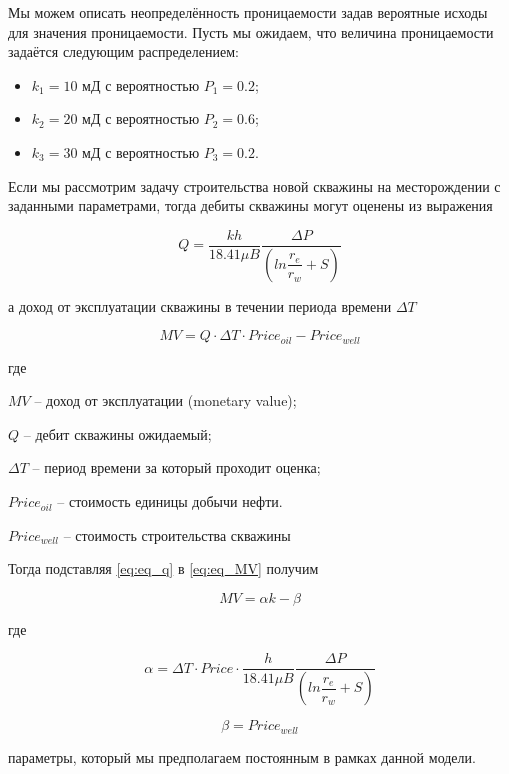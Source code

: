 Мы  можем описать неопределённость проницаемости задав вероятные исходы для значения проницаемости. Пусть мы ожидаем, что величина проницаемости задаётся следующим распределением:

\begin{itemize}
	\item $k_1 = 10$ мД с вероятностью $P_1 = 0.2$; 
	\item $k_2 = 20$ мД с вероятностью $P_2 = 0.6$; 
	\item $k_3 = 30$ мД с вероятностью $P_3 = 0.2$. 
\end{itemize}

Если мы рассмотрим задачу строительства новой скважины на месторождении с заданными параметрами, тогда дебиты скважины могут оценены из выражения

\begin{equation}
	Q = \frac{kh}{18.41 \mu B} \frac{\Delta P}{  \left( ln\dfrac{r_e}{r_w} + S\right) }
	\label{eq:eq_q}
\end{equation}


а доход от эксплуатации скважины в течении периода времени  $\Delta T$

\begin{equation}
	MV = Q \cdot  \Delta T \cdot  Price_{oil} - Price_{well}
	\label{eq:eq_MV}
\end{equation}

где 

$MV$ -- доход от эксплуатации (monetary value);

$Q$ -- дебит скважины ожидаемый;
 
$\Delta T$ -- период времени за который проходит оценка;

$Price_{oil}$ -- стоимость единицы добычи нефти.

$Price_{well}$ -- стоимость строительства скважины

Тогда подставляя \eqref{eq:eq_q} в \eqref{eq:eq_MV} получим 

\begin{equation}
	MV = \alpha k - \beta
	\label{eq:eq_MV_2}
\end{equation}

где 

$$\alpha =  \Delta T \cdot  Price \cdot \frac{h}{18.41 \mu B} \frac{\Delta P}{  \left( ln\dfrac{r_e}{r_w} + S\right)}
$$ 

$$
\beta = Price_{well}
$$

параметры, который мы предполагаем постоянным в рамках данной модели. 

